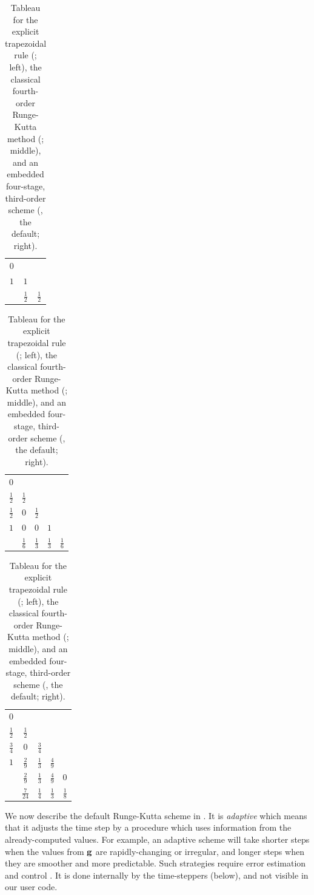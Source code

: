 \begin{table}
\begin{tabular}{c|cc}
$0$   \\
$1$ & $1$ \\ \hline
    & $\frac{1}{2}$ & $\frac{1}{2}$
\end{tabular}
\hfill
\begin{tabular}{c|cccc}
$0$   \\
$\frac{1}{2}$ & $\frac{1}{2}$ \\
$\frac{1}{2}$ & $0$           & $\frac{1}{2}$ \\
$1$           & $0$           & $0$           & $1$  \\ \hline
              & $\frac{1}{6}$ & $\frac{1}{3}$ & $\frac{1}{3}$ & $\frac{1}{6}$
\end{tabular}
\hfill
\begin{tabular}{c|cccc}
$0$   \\
$\frac{1}{2}$ & $\frac{1}{2}$ \\
$\frac{3}{4}$ & $0$           & $\frac{3}{4}$ \\
$1$           & $\frac{2}{9}$ & $\frac{1}{3}$ & $\frac{4}{9}$ \\ \hline
              & $\frac{2}{9}$ & $\frac{1}{3}$ & $\frac{4}{9}$ & $0$ \\
              & $\frac{7}{24}$ & $\frac{1}{4}$ & $\frac{1}{3}$ & $\frac{1}{8}$
\end{tabular}
\medskip
\caption{Tableau for the explicit trapezoidal rule (\RKtwoa; left), the classical fourth-order Runge-Kutta method (\RKfour; middle), and an embedded four-stage, third-order scheme (\RKthreebs, the \PETSc default; right).} \label{tab:ts:exampletableau}
\end{table}

We now describe the default Runge-Kutta scheme in \PETSc.  It is \emph{adaptive} which means that it adjusts the time step by a procedure which uses information from the already-computed values.  For example, an adaptive scheme will take shorter steps when the values from $\mathbf{g}$ are rapidly-changing or irregular, and longer steps when they are smoother and more predictable.  Such strategies require error estimation and control \citep{AscherPetzold1998}.  It is done internally by the \PETSc time-steppers (below), and not visible in our user code.

